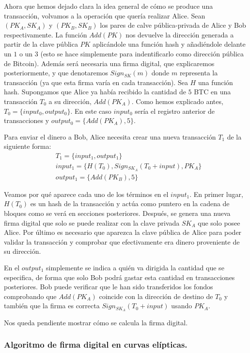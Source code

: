 \documentclass[twoside]{article}
\theoremstyle{definition}
\begin{document}
Ahora que hemos dejado clara la idea general de cómo se produce una transacción, volvamos a la operación que quería realizar Alice. Sean $(PK_A,SK_A)$ y $(PK_B,SK_B)$ los pares de calve pública-privada de Alice y Bob respectivamente. La función $Add(PK)$ nos devuelve la dirección generada a partir de la clave pública $PK$ aplicándole una función hash y añadiéndole delante un $1$ o un $3$ (esto se hace simplemente para indentificarlo como dirección pública de Bitcoin). Además será necesaria una firma digital, que explicaremos posteriormente, y que denotaremos $Sign_{SK}(m)$ donde $m$ representa la transacción (ya que esta firma varía en cada transacción). Sea $H$ una función hash. Supongamos que Alice ya había recibido la cantidad de $5$ BTC en una transacción $T_0$ a su dirección, $Add(PK_A)$.  Como hemos explicado antes, $T_0=\{input_0, output_0\}$. En este caso $input_0$ sería el registro anterior de transacciones y $output_0=\{Add(PK_A),5\}$. 

Para enviar el dinero a Bob, Alice necesita crear una nueva transacción $T_1$ de la siguiente forma:
\begin{align*}
&T_1=\{input_1,output_1\}\\
&input_1=\{H(T_0),Sign_{SK_A}(T_0+input),PK_A\}\\
&output_1=\{Add(PK_B),5\}
\end{align*}

Veamos por qué aparece cada uno de los términos en el $input_1$. En primer lugar, $H(T_0)$ es un hash de la transacción y actúa como puntero en la cadena de bloques como se verá en secciones posteriores. Después, se genera una nueva firma digital que solo se puede realizar con la clave privada $SK_A$ que solo posee Alice. Por último es necesario que aparezca la clave pública de Alice para poder validar la transacción y comprobar que efectivamente era dinero proveniente de su dirección. 

En el $output_1$ simplemente se indica a quién va dirigida la cantidad que se especifica, de forma que solo Bob podrá gastar esta cantidad en transacciones posteriores. Bob puede verificar que le han sido transferidos los fondos comprobando que $Add(PK_A)$ coincide con la dirección de destino de $T_0$ y también que la firma es correcta $Sign_{SK_A}(T_0+input)$ usando $PK_A$. 

Nos queda pendiente mostrar cómo se calcula la firma digital.

\subsubsection{Algoritmo de firma digital en curvas elípticas. }
\end{document}
